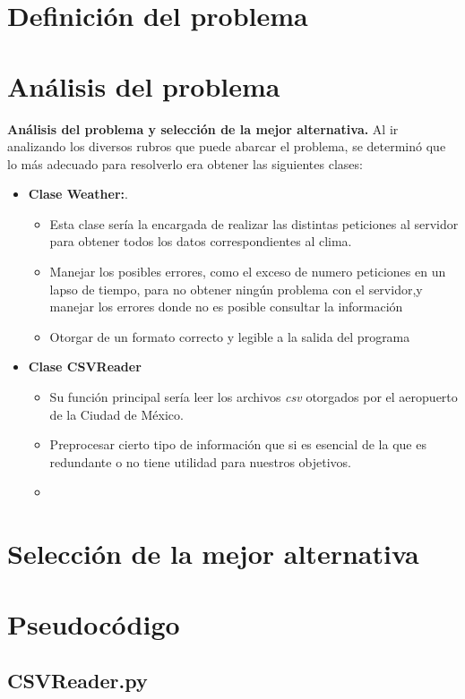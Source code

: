 \documentclass[letterpaper]{article}
\begin{document}
\section{Definición del problema}
\section{Análisis del problema}
	\textbf{Análisis del problema y selección de la mejor alternativa. }
	Al ir analizando los diversos rubros que puede abarcar el problema, se determinó que lo más adecuado para resolverlo era obtener las siguientes clases:
	\begin{itemize}
		\item \textbf{Clase Weather:}.
		\begin{itemize}
			\item Esta clase sería la encargada de realizar las distintas peticiones al servidor para obtener todos los datos correspondientes al clima.
			\item Manejar los posibles errores, como el exceso de numero peticiones en un lapso de tiempo, para no obtener ningún problema con el servidor,y manejar los errores donde no es posible consultar la información
			\item Otorgar de un formato correcto y legible a la salida del programa
		\end{itemize}
		\item \textbf{Clase CSVReader}
		\begin{itemize}
			\item Su función principal sería leer los archivos \textit{csv} otorgados por el aeropuerto de la Ciudad de México.  
			\item Preprocesar cierto tipo de información que si es esencial de la que es redundante o no tiene utilidad para nuestros objetivos.
			\item
			
		\end{itemize}
	\end{itemize}
	
\section{Selección de la mejor alternativa}
\newpage
\section{Pseudocódigo}

	\subsection*{CSVReader.py}
	
\end{document}
